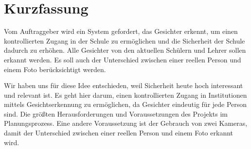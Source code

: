 \chapter*{Kurzfassung}


	Vom Auftraggeber wird ein System gefordert, das Gesichter erkennt, um einen kontrollierten Zugang in der Schule zu ermöglichen und die Sicherheit der Schule dadurch zu erh\"ohen. Alle Gesichter von den aktuellen Sch\"ulern und Lehrer sollen erkannt werden. Es soll auch der Unterschied zwischen einer reellen Person und einem Foto berücksichtigt werden.
	
	Wir haben uns für diese Idee entschieden, weil Sicherheit heute hoch interessant und relevant ist. Es geht hier darum, einen kontrollierten Zugang in Institutionen mittels Gesichtserkennung zu ermöglichen, da Gesichter eindeutig für jede Person sind. Die größten Herausforderungen und Voraussetzungen des Projekts im Planungsprozess. Eine andere Voraussetzung ist der Gebrauch von zwei Kameras, damit der Unterschied zwischen einer reellen Person und einem Foto erkannt wird.
		


\color{black} 

